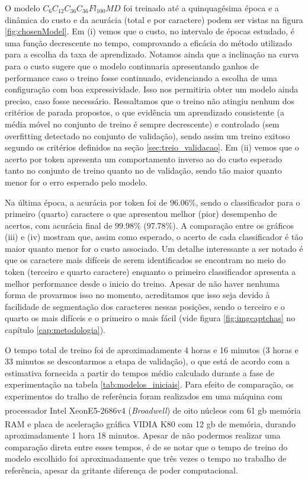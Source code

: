 O modelo $C_6C_{12}C_{36}C_{36}Fl_{100}MD$ foi treinado até a quinquagésima época e a dinâmica do custo e da acurácia (total e por caractere) podem ser vistas na figura \ref{fig:chosenModel}. Em (i) vemos que o custo, no intervalo de épocas estudado, é uma função decrescente no tempo, comprovando a eficácia do método utilizado para a escolha da taxa de aprendizado. Notamos ainda que a inclinação na curva para o custo sugere que o modelo continuaria apresentando ganhos de performance caso o treino fosse continuado, evidenciando a escolha de uma configuração com boa expressividade. Isso nos permitiria obter um modelo ainda preciso, caso fosse necessário. Ressaltamos que o treino não atingiu nenhum dos critérios de parada propostos, o que evidência um aprendizado consistente (a média móvel no conjunto de treino é sempre decrescente) e controlado (sem overfitting detectado no conjunto de validação), sendo assim um treino exitoso segundo os critérios definidos na seção \ref{sec:treio_validacao}. Em (ii) vemos que o acerto por token apresenta um comportamento inverso ao do custo esperado tanto no conjunto de treino quanto no de validação, sendo tão maior quanto menor for o erro esperado pelo modelo. 

Na última época, a acurácia por token foi de $96.06\%$, sendo o classificador para o primeiro (quarto) caractere o que apresentou melhor (pior) desempenho de acertos, com acurácia final de $99.98\%$ ($97.78\%$). A comparação entre os gráficos (iii) e (iv) mostram que, assim como esperado, o acerto de cada classificador é tão maior quanto menor for o custo associado. Um detalhe interessante a ser notado é que os caractere mais difíceis de serem identificados se encontram no meio do token (terceiro e quarto caractere) enquanto o primeiro classificador apresenta a melhor performance desde o inicio do treino. Apesar de não haver nenhuma forma de provarmos isso no momento, acreditamos que isso seja devido à facilidade de segmentação dos caracteres nessas posições, sendo o terceiro e o quarto os mais difíceis e o primeiro o mais fácil (vide figura \ref{fig:imgcaptchas} no capítulo \ref{cap:metodologia}).

O tempo total de treino foi de aproximadamente 4 horas e 16 minutos (3 horas e 33 minutos se descontarmos a etapa de validação), o que está de acordo com a estimativa fornecida a partir do tempos médio calculado durante a fase de experimentação na tabela \ref{tab:modelos_iniciais}. Para efeito de comparação, os experimentos do tralho de referência foram realizados em uma máquina com processador Intel\textsuperscript{\textregistered} Xeon\texttrademark E5-2686v4 (\textit{Broadwell}) de oito núcleos com 61 gb memória RAM e placa de aceleração gráfica VIDIA\textsuperscript{\textregistered} K80 com 12 gb de memória, durando aproximadamente 1 hora 18 minutos. Apesar de não podermos realizar uma comparação direta entre esses tempos, é de se notar que o tempo de treino do modelo escolhido foi aproximadamente que três vezes o tempo no trabalho de referência, apesar da gritante diferença de poder computacional. 

